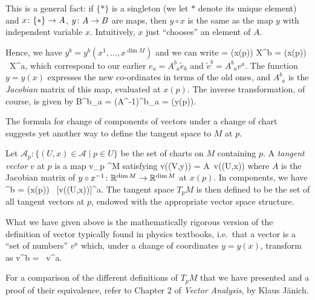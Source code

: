This is a general fact: if $\{*\}$ is a singleton (we let $*$ denote its unique element) and $x\colon\{*\}\to A$, $y\colon A \to B$ are maps, then $y\circ x$ is the same as the map $y$ with independent variable $x$. Intuitively, $x$ just ``chooses'' an element of $A$.

Hence, we have $y^b = y^b(x^1,\ldots,x^{\dim M})$ and we can write
\bse
{}= (x(p)) \qquad {} \qquad \widetilde X^b = (x(p)) \, X^a,
\ese
which correspond to our earlier $e_a=A^{b}_{\phantom{b}a}\widetilde e_b$ and $\widetilde v^b=A^b_{\phantom{b}a}v^a$. The function $y=y(x)$ expresses the new co-ordinates in terms of the old ones, and $A^{b}_{\phantom{b}a}$ is the \emph{Jacobian} matrix of this map, evaluated at $x(p)$. The inverse transformation, of course, is given by
\bse
B^b_{\phantom{b}a} = (A^{-1})^b_{\phantom{b}a} = (y(p)).
\ese
\er

\br
The formula for change of components of vectors under a change of chart suggests yet another way to define the tangent space to $M$ at $p$.

Let $\mathscr{A}_p:\{(U,x)\in \mathscr{A}\mid p \in U\}$ be the set of charts on $M$ containing $p$. A \emph{tangent vector} $v$ at $p$ is a map
\bse
v\cl {}_p \to \R^{\dim M}
\ese
satisfying
\bse
v((V,y)) = A\, v((U,x))
\ese
where $A$ is the Jacobian matrix of $y\circ x^{-1}\colon\mathbb{R}^{\dim M}\to\mathbb{R}^{\dim M}$ at $x(p)$. In components, we have
\bse
[v((V,y))]^b = (x(p)) \, [v((U,x))]^a.
\ese
The tangent space $T_pM$ is then defined to be the set of all tangent vectors at $p$, endowed with the appropriate vector space structure.

What we have given above is the mathematically rigorous version of the definition of vector typically found in physics textbooks, i.e.\ that a vector is a ``set of numbers'' $v^a$ which, under a change of coordinates $y=y(x)$, transform as
\bse
\widetilde v^b =  \, v^a.
\ese

For a comparison of the different definitions of $T_pM$  that we have presented and a proof of their equivalence, refer to Chapter 2 of \emph{Vector Analysis}, by Klaus J\"anich.
\er















